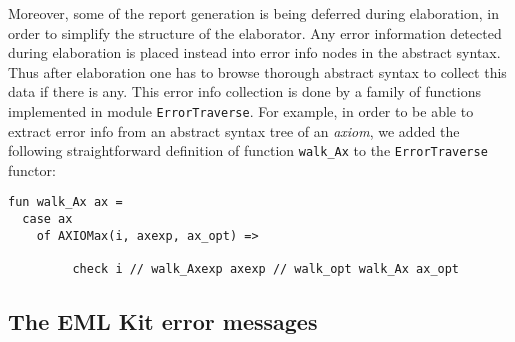 Moreover, some of the report generation is being deferred during 
elaboration, in order to simplify the structure of the elaborator.
Any error information detected during elaboration is placed instead 
into error info nodes in the abstract syntax.
Thus after elaboration one has to browse thorough abstract syntax to 
collect this data if there is any.
This error info collection is done by a family of functions implemented
in module {\tt ErrorTraverse}. For example, in order to be able 
to extract error info from an abstract syntax tree of an {\em axiom}, we 
added the following straightforward definition of function {\tt walk\_Ax} 
to the {\tt ErrorTraverse} functor:
{\small
\begin{verbatim}
fun walk_Ax ax =
  case ax
    of AXIOMax(i, axexp, ax_opt) =>

         check i // walk_Axexp axexp // walk_opt walk_Ax ax_opt
\end{verbatim}
}


\subsection{The EML Kit error messages}
\label{sec:messages}

